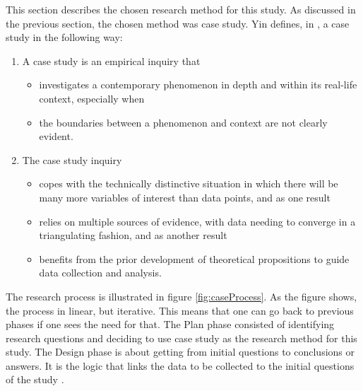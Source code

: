 This section describes the chosen research method for this study. As discussed in the previous section, the chosen method was case study. Yin defines, in \cite{CaseStudyResearch}, a case study in the following way:

\begin{enumerate}
\item A case study is an empirical inquiry that
\begin{itemize}
\item investigates a contemporary phenomenon in depth and within its real-life context, especially when
\item the boundaries between a phenomenon and context are not clearly evident.
\end{itemize}
\item The case study inquiry
\begin{itemize}
\item copes with the technically distinctive situation in which there will be many more variables of interest than data points, and as one result
\item relies on multiple sources of evidence, with data needing to converge in a triangulating fashion, and as another result
\item benefits from the prior development of theoretical propositions to guide data collection and analysis.
\end{itemize}
\end{enumerate}

The research process is illustrated in figure \ref{fig:caseProcess}. As the figure shows, the process in linear, but iterative. This means that one can go back to previous phases if one sees the need for that. The Plan phase consisted of  identifying research questions and deciding to use case study as the research method for this study. The Design phase is about getting from initial questions to conclusions or answers. It is the logic that links the data to be collected to the initial questions of the study \cite{CaseStudyResearch}. 

